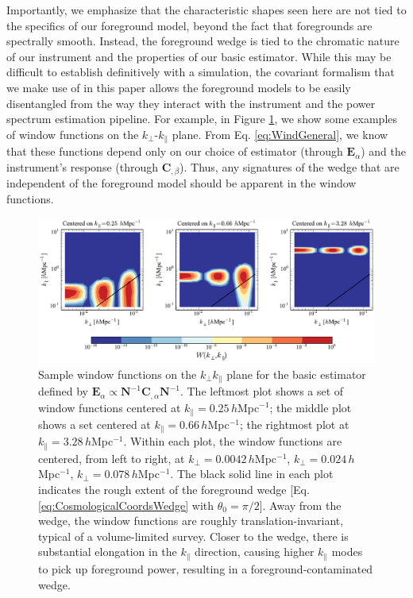 \documentclass[twocolumn,aps,prd,nofootinbib,showpacs]{revtex4-1}
\begin{document}
Importantly, we emphasize that the characteristic shapes seen here are not tied to the specifics of our foreground model, beyond the fact that foregrounds are spectrally smooth.  Instead, the foreground wedge is tied to the chromatic nature of our instrument and the properties of our basic estimator.  While this may be difficult to establish definitively with a simulation, the covariant formalism that we make use of in this paper allows the foreground models to be easily disentangled from the way they interact with the instrument and the power spectrum estimation pipeline.  For example, in Figure \ref{fig:basicEstWindows}, we show some examples of window functions on the $k_\perp$-$k_\parallel$ plane.  From  Eq. \eqref{eq:WindGeneral}, we know that these functions depend only on our choice of estimator (through $\mathbf{E}_\alpha$) and the instrument's response (through $\mathbf{C}_{,\beta}$).  Thus, any signatures of the wedge that are independent of the foreground model should be apparent in the window functions.

\begin{figure}[!ht] 
	\centering 
	\includegraphics[width=1\textwidth]{figures/simpleEstWindCollection.pdf}
	\caption{Sample window functions on the $k_\perp k_\parallel$ plane for the basic estimator defined by $\mathbf{E}_\alpha \propto \mathbf{N}^{-1} \mathbf{C}_{,\alpha} \mathbf{N}^{-1}$.  The leftmost plot shows a set of window functions centered at $k_\parallel = 0.25\,h$Mpc$^{-1}$; the middle plot shows a set centered at $k_\parallel = 0.66\,h$Mpc$^{-1}$; the rightmost plot at $k_\parallel = 3.28\,h$Mpc$^{-1}$.  Within each plot, the window functions are centered, from left to right, at $k_\perp = 0.0042\,h$Mpc$^{-1}$, $k_\perp = 0.024\,h$Mpc$^{-1}$, $k_\perp = 0.078\,h$Mpc$^{-1}$.  The black solid line in each plot indicates the rough extent of the foreground wedge [Eq. \eqref{eq:CosmologicalCoordsWedge} with $\theta_0 = \pi / 2$].  Away from the wedge, the window functions are roughly translation-invariant, typical of a volume-limited survey.  Closer to the wedge, there is substantial elongation in the $k_\parallel$ direction, causing higher $k_\parallel$ modes to pick up foreground power, resulting in a foreground-contaminated wedge.}
	\label{fig:basicEstWindows}
\end{figure}
\end{document}
